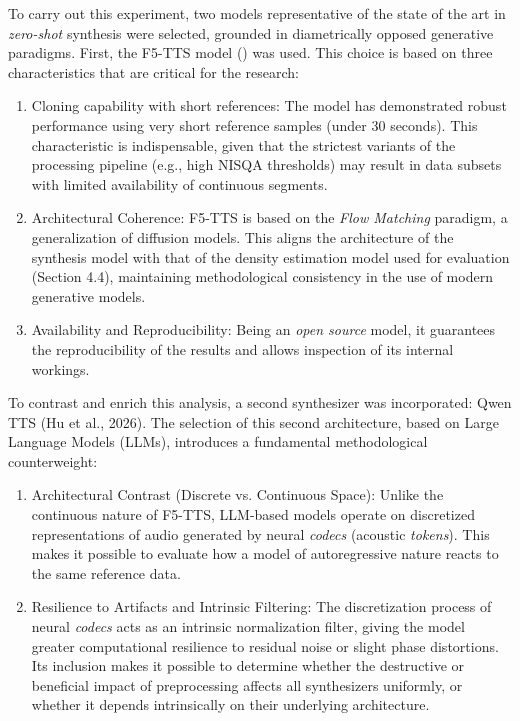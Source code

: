 To carry out this experiment, two models representative of the state of the art in \textit{zero-shot} synthesis were selected, grounded in diametrically opposed generative paradigms. First, the F5-TTS model (\cite{chen2024f5}) was used. This choice is based on three characteristics that are critical for the research:

\begin{enumerate}
    \item Cloning capability with short references: The model has demonstrated robust performance using very short reference samples (under 30 seconds). This characteristic is indispensable, given that the strictest variants of the processing pipeline (e.g., high NISQA thresholds) may result in data subsets with limited availability of continuous segments.
    \item Architectural Coherence: F5-TTS is based on the \textit{Flow Matching} paradigm, a generalization of diffusion models. This aligns the architecture of the synthesis model with that of the density estimation model used for evaluation (Section 4.4), maintaining methodological consistency in the use of modern generative models.
    \item Availability and Reproducibility: Being an \textit{open source} model, it guarantees the reproducibility of the results and allows inspection of its internal workings.
\end{enumerate}

To contrast and enrich this analysis, a second synthesizer was incorporated: Qwen TTS (Hu et al., 2026). The selection of this second architecture, based on Large Language Models (LLMs), introduces a fundamental methodological counterweight:

\begin{enumerate}
    \item Architectural Contrast (Discrete vs. Continuous Space): Unlike the continuous nature of F5-TTS, LLM-based models operate on discretized representations of audio generated by neural \textit{codecs} (acoustic \textit{tokens}). This makes it possible to evaluate how a model of autoregressive nature reacts to the same reference data.
    \item Resilience to Artifacts and Intrinsic Filtering: The discretization process of neural \textit{codecs} acts as an intrinsic normalization filter, giving the model greater computational resilience to residual noise or slight phase distortions. Its inclusion makes it possible to determine whether the destructive or beneficial impact of preprocessing affects all synthesizers uniformly, or whether it depends intrinsically on their underlying architecture.
\end{enumerate}

